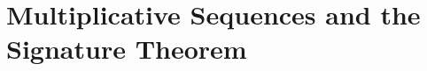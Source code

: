 \documentclass[../main]{subfiles}
\begin{document}
\chapter{Multiplicative Sequences and the Signature Theorem}\label{ch:19}


\end{document}
